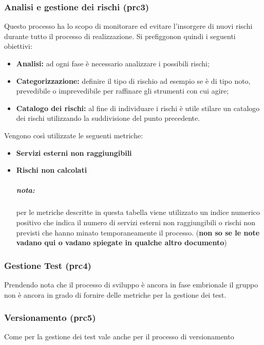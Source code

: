 \subsubsection{Analisi e gestione dei rischi (prc3)}
Questo processo ha lo scopo di monitorare ed evitare l'insorgere di nuovi rischi durante tutto il processo di realizzazione. Si prefiggonon quindi i seguenti obiettivi:
\begin{itemize}
	\item{\textbf{Analisi:} ad ogni fase è necessario analizzare i possibili rischi;}
	\item{\textbf{Categorizzazione:}  definire il tipo di rischio ad esempio se è di tipo noto, prevedibile o imprevedibile per raffinare gli strumenti con cui agire;}
	\item{\textbf{Catalogo dei rischi:} al fine di individuare i rischi è utile stilare un catalogo dei rischi utilizzando la suddivisione del punto precedente.}
\end{itemize}
Vengono così utilizzate le seguenti metriche: 
\begin{itemize}
	\item{\textbf{Servizi esterni non raggiungibili}}
	\item{\textbf{Rischi non calcolati}}
	\subparagraph{nota:} per le metriche descritte in questa tabella viene utilizzato un indice numerico positivo che indica il numero di servizi esterni non raggiungibili o rischi non previsti che hanno minato temporaneamente il processo. (\textbf{non so se le note vadano qui o vadano spiegate in qualche altro documento})
\end{itemize}
\begin{table}[!htbp]
	\centering
	\renewcommand{\arraystretch}{2} 
\end{table}
\newpage
\subsubsection{Gestione Test (prc4)}
Prendendo nota che il processo di sviluppo è ancora in fase embrionale il gruppo non è ancora in grado di fornire delle metriche per la gestione dei test.
\subsubsection{Versionamento (prc5)}
Come per la gestione dei test vale anche per il processo di versionamento